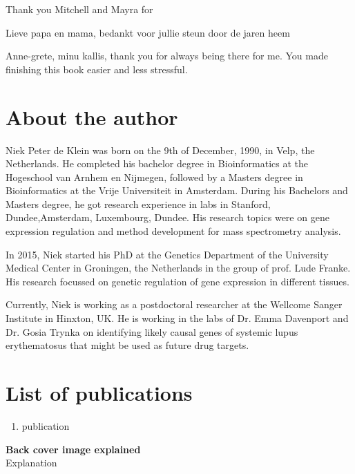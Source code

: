 \begin{appendices}
Thank you Mitchell and Mayra for 

Lieve papa en mama, bedankt voor jullie steun door de jaren heem

Anne-grete, minu kallis, thank you for always being there for me. You made finishing this book easier and less stressful. 

\chapter{About the author}

Niek Peter de Klein was born on the 9th of December, 1990, in Velp, the Netherlands. He completed his bachelor degree in Bioinformatics at the Hogeschool van Arnhem en Nijmegen, followed by a Masters degree in Bioinformatics at the Vrije Universiteit in Amsterdam. During his Bachelors and Masters degree, he got research experience in labs in Stanford, Dundee,Amsterdam, Luxembourg, Dundee. His research topics were on gene expression regulation and method development for mass spectrometry analysis.  

In 2015, Niek started his PhD at the Genetics Department of the University Medical Center in Groningen, the Netherlands in the group of prof. Lude Franke. His research focussed on genetic regulation of gene expression in different tissues. 


Currently, Niek is working as a postdoctoral researcher at the Wellcome Sanger Institute in Hinxton, UK. He is working in the labs of Dr. Emma Davenport and Dr. Gosia Trynka on identifying likely causal genes of systemic lupus erythematosus that might be used as future drug targets.

\chapter{List of publications}

\nocite{*}




\printbibliography[heading={subbibliography},title={Journal Articles},type=article]


\printbibliography[heading={subbibliography},title={Books and Chapters},filter={booksandchapters}]

\begin{enumerate}
\item publication
\end{enumerate}



\end{appendices}

\clearpage
\pagestyle{empty}

\noindent
\textbf{Back cover image explained}\\
Explanation

